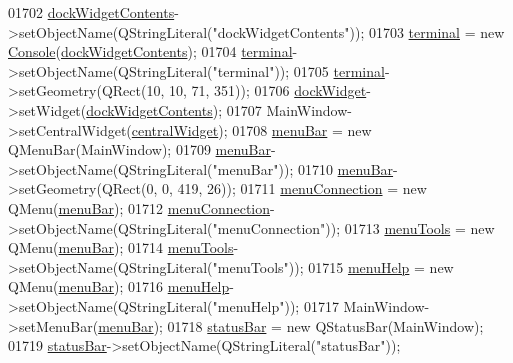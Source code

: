 \begin{DoxyCode}
01702         \hyperlink{a00080_a765ded8236736213d556f6f91941808e}{dockWidgetContents}->setObjectName(QStringLiteral(\textcolor{stringliteral}{"dockWidgetContents"}));
01703         \hyperlink{a00080_aae71c46ea4546df5994735dee573b2dd}{terminal} = \textcolor{keyword}{new} \hyperlink{a00005}{Console}(\hyperlink{a00080_a765ded8236736213d556f6f91941808e}{dockWidgetContents});
01704         \hyperlink{a00080_aae71c46ea4546df5994735dee573b2dd}{terminal}->setObjectName(QStringLiteral(\textcolor{stringliteral}{"terminal"}));
01705         \hyperlink{a00080_aae71c46ea4546df5994735dee573b2dd}{terminal}->setGeometry(QRect(10, 10, 71, 351));
01706         \hyperlink{a00080_ac8a083c4b66fb317a9b538409ce412e2}{dockWidget}->setWidget(\hyperlink{a00080_a765ded8236736213d556f6f91941808e}{dockWidgetContents});
01707         MainWindow->setCentralWidget(\hyperlink{a00080_a30075506c2116c3ed4ff25e07ae75f81}{centralWidget});
01708         \hyperlink{a00080_a2be1c24ec9adfca18e1dcc951931457f}{menuBar} = \textcolor{keyword}{new} QMenuBar(MainWindow);
01709         \hyperlink{a00080_a2be1c24ec9adfca18e1dcc951931457f}{menuBar}->setObjectName(QStringLiteral(\textcolor{stringliteral}{"menuBar"}));
01710         \hyperlink{a00080_a2be1c24ec9adfca18e1dcc951931457f}{menuBar}->setGeometry(QRect(0, 0, 419, 26));
01711         \hyperlink{a00080_a08372e1c0820afb98e2cdf98d1738036}{menuConnection} = \textcolor{keyword}{new} QMenu(\hyperlink{a00080_a2be1c24ec9adfca18e1dcc951931457f}{menuBar});
01712         \hyperlink{a00080_a08372e1c0820afb98e2cdf98d1738036}{menuConnection}->setObjectName(QStringLiteral(\textcolor{stringliteral}{"menuConnection"}));
01713         \hyperlink{a00080_a552c7b6d729252c2768c9a077679fef7}{menuTools} = \textcolor{keyword}{new} QMenu(\hyperlink{a00080_a2be1c24ec9adfca18e1dcc951931457f}{menuBar});
01714         \hyperlink{a00080_a552c7b6d729252c2768c9a077679fef7}{menuTools}->setObjectName(QStringLiteral(\textcolor{stringliteral}{"menuTools"}));
01715         \hyperlink{a00080_ab95dbfbb0550206aeac76db36f491548}{menuHelp} = \textcolor{keyword}{new} QMenu(\hyperlink{a00080_a2be1c24ec9adfca18e1dcc951931457f}{menuBar});
01716         \hyperlink{a00080_ab95dbfbb0550206aeac76db36f491548}{menuHelp}->setObjectName(QStringLiteral(\textcolor{stringliteral}{"menuHelp"}));
01717         MainWindow->setMenuBar(\hyperlink{a00080_a2be1c24ec9adfca18e1dcc951931457f}{menuBar});
01718         \hyperlink{a00080_a50fa481337604bcc8bf68de18ab16ecd}{statusBar} = \textcolor{keyword}{new} QStatusBar(MainWindow);
01719         \hyperlink{a00080_a50fa481337604bcc8bf68de18ab16ecd}{statusBar}->setObjectName(QStringLiteral(\textcolor{stringliteral}{"statusBar"}));

\end{DoxyCode}
